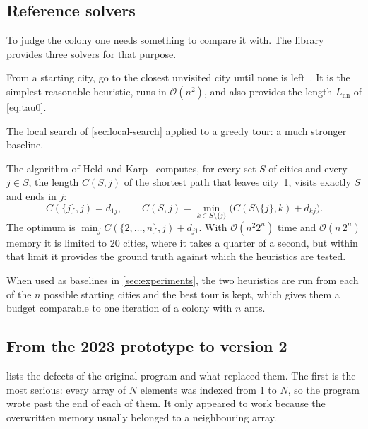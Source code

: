 \documentclass[11pt,a4paper]{article}
\newcommand{\bigO}{\mathcal{O}}
\begin{document}
\subsection{Reference solvers}

To judge the colony one needs something to compare it with. The library provides three
solvers for that purpose.

\begin{description}[leftmargin=0pt]
    \item[Nearest neighbour.] From a starting city, go to the closest unvisited city until
          none is left~\cite{rosenkrantz1977analysis}. It is the simplest reasonable heuristic,
          runs in $\bigO(n^2)$, and also provides the length $L_{\mathrm{nn}}$ of
          \cref{eq:tau0}.
    \item[Nearest neighbour followed by 2-opt.] The local search of
          \cref{sec:local-search} applied to a greedy tour: a much stronger baseline.
    \item[Exact dynamic programming.] The algorithm of Held and
          Karp~\cite{held1962dynamic} computes, for every set $S$ of cities and every $j\in S$,
          the length $C(S,j)$ of the shortest path that leaves city~1, visits exactly $S$ and
          ends in $j$:
          \[
              C(\{j\},j)=d_{1j},\qquad
              C(S,j)=\min_{k\in S\setminus\{j\}}\bigl(C(S\setminus\{j\},k)+d_{kj}\bigr).
          \]
          The optimum is $\min_j C(\{2,\dots,n\},j)+d_{j1}$. With $\bigO(n^2 2^n)$ time and
          $\bigO(n\,2^n)$ memory it is limited to 20 cities, where it takes a quarter of a
          second, but within that limit it provides the ground truth against which the heuristics
          are tested.
\end{description}

When used as baselines in \cref{sec:experiments}, the two heuristics are run from each
of the $n$ possible starting cities and the best tour is kept, which gives them a budget
comparable to one iteration of a colony with $n$ ants.

\subsection{From the 2023 prototype to version 2}

 lists the defects of the original program and what replaced them.
The first is the most serious: every array of $N$ elements was indexed from 1 to $N$, so
the program wrote past the end of each of them. It only appeared to work because the
overwritten memory usually belonged to a neighbouring array.
\end{document}
